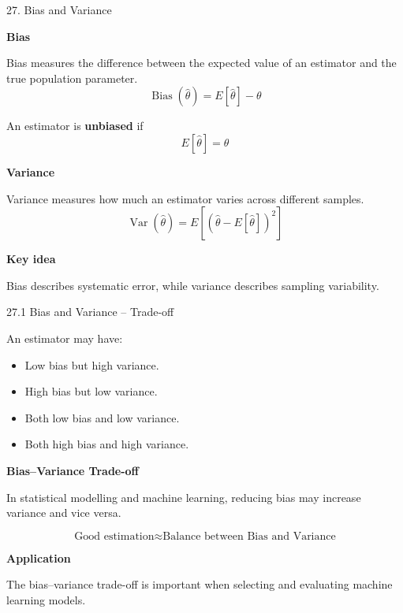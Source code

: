 \begin{frame}{27. Bias and Variance}

\textbf{Bias}

Bias measures the difference between the expected value of
an estimator and the true population parameter.
\[
\boxed{
\operatorname{Bias}(\hat{\theta})
=
E[\hat{\theta}]-\theta
}
\]

An estimator is \textbf{unbiased} if
\[
\boxed{
E[\hat{\theta}]=\theta
}
\]

\textbf{Variance}

Variance measures how much an estimator varies across
different samples.
\[
\boxed{
\operatorname{Var}(\hat{\theta})
=
E[(\hat{\theta}-E[\hat{\theta}])^2]
}
\]

\textbf{Key idea}

Bias describes systematic error, while variance describes
sampling variability.

\end{frame}



\begin{frame}{27.1 Bias and Variance -- Trade-off}

An estimator may have:

\begin{itemize}
    \item Low bias but high variance.
    \item High bias but low variance.
    \item Both low bias and low variance.
    \item Both high bias and high variance.
\end{itemize}

\vspace{0.4cm}

\textbf{Bias--Variance Trade-off}

In statistical modelling and machine learning, reducing
bias may increase variance and vice versa.

\[
\boxed{
\text{Good estimation}
\approx
\text{Balance between Bias and Variance}
}
\]

\textbf{Application}

The bias--variance trade-off is important when selecting
and evaluating machine learning models.

\end{frame}


